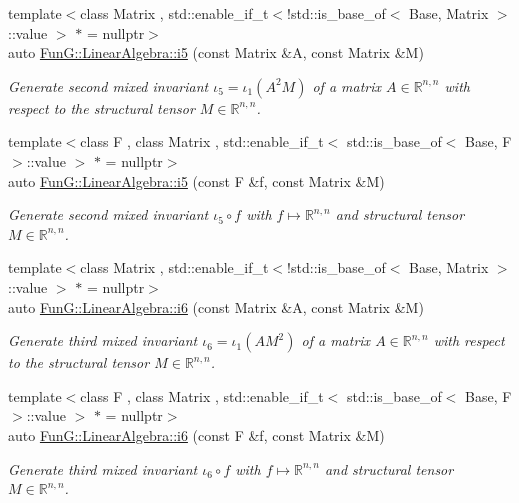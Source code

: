 \begin{DoxyCompactItemize}
{\footnotesize template$<$class Matrix , std\+::enable\+\_\+if\+\_\+t$<$!std\+::is\+\_\+base\+\_\+of$<$ Base, Matrix $>$\+::value $>$ $\ast$  = nullptr$>$ }\\auto \hyperlink{group__InvariantGroup_gabedc42182203d883278e29fd16b355a0}{Fun\+G\+::\+Linear\+Algebra\+::i5} (const Matrix \&A, const Matrix \&M)
\begin{DoxyCompactList}\small\item\em Generate second mixed invariant $ \iota_5=\iota_1(A^2M) $ of a matrix $A\in\mathbb{R}^{n,n}$ with respect to the structural tensor $M\in\mathbb{R}^{n,n}$. \end{DoxyCompactList}\item 
{\footnotesize template$<$class F , class Matrix , std\+::enable\+\_\+if\+\_\+t$<$ std\+::is\+\_\+base\+\_\+of$<$ Base, F $>$\+::value $>$ $\ast$  = nullptr$>$ }\\auto \hyperlink{group__InvariantGroup_gaed7e47c39d89f2b01e25c992da78b44d}{Fun\+G\+::\+Linear\+Algebra\+::i5} (const F \&f, const Matrix \&M)
\begin{DoxyCompactList}\small\item\em Generate second mixed invariant $ \iota_5\circ f $ with $f\mapsto\mathbb{R}^{n,n}$ and structural tensor $M\in\mathbb{R}^{n,n}$. \end{DoxyCompactList}\item 
{\footnotesize template$<$class Matrix , std\+::enable\+\_\+if\+\_\+t$<$!std\+::is\+\_\+base\+\_\+of$<$ Base, Matrix $>$\+::value $>$ $\ast$  = nullptr$>$ }\\auto \hyperlink{group__InvariantGroup_gad9f0627946667bb052212f65ecdd002b}{Fun\+G\+::\+Linear\+Algebra\+::i6} (const Matrix \&A, const Matrix \&M)
\begin{DoxyCompactList}\small\item\em Generate third mixed invariant $ \iota_6=\iota_1(AM^2) $ of a matrix $A\in\mathbb{R}^{n,n}$ with respect to the structural tensor $M\in\mathbb{R}^{n,n}$. \end{DoxyCompactList}\item 
{\footnotesize template$<$class F , class Matrix , std\+::enable\+\_\+if\+\_\+t$<$ std\+::is\+\_\+base\+\_\+of$<$ Base, F $>$\+::value $>$ $\ast$  = nullptr$>$ }\\auto \hyperlink{group__InvariantGroup_ga2536c80df733bb3e089487202c3688c1}{Fun\+G\+::\+Linear\+Algebra\+::i6} (const F \&f, const Matrix \&M)
\begin{DoxyCompactList}\small\item\em Generate third mixed invariant $ \iota_6\circ f $ with $f\mapsto\mathbb{R}^{n,n}$ and structural tensor $M\in\mathbb{R}^{n,n}$. \end{DoxyCompactList}\item 

\end{DoxyCompactItemize}
